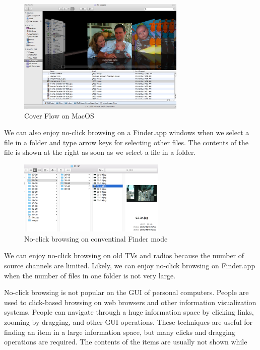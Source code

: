\documentclass{article}
\begin{document}
\begin{figure}[H]
\centerline{\includegraphics[width=80mm,bb=0 0 1080 740]{figures/902678c6770b5e043baa6f503375749f.jpg}}
\caption{Cover Flow on MacOS}
\label{coverflow}
\end{figure}

We can also enjoy no-click browsing on a Finder.app windows
when we select a file in a folder and
type arrow keys for selecting other files.
The contents of the file is shown at the right as soon as
we select a file in a folder.

\begin{figure}[H]
\centerline{\includegraphics[width=70mm,bb=0 0 839 423]{figures/10d7ca6c55aa93ebcdab799246e4c087.jpg}}
\caption{No-click browsing on conventinal Finder mode}
\label{noclickfinder}
\end{figure}



We can enjoy no-click browsing on old TVs and radios because the number of
source channels are limited.
Likely, we can enjoy no-click browsing on Finder.app when the number of files
in one folder is not very large.

No-click browsing is not popular on the GUI of personal computers.
People are used to click-based browsing on web browsers and other
information visualization systems.
People can navigate through a huge information space by
clicking links, zooming by dragging, and other GUI operations.
These techniques are useful for finding an item in a large information space,
but many clicks and dragging operations are required.
The contents of the items are usually not shown while 
\end{document}

